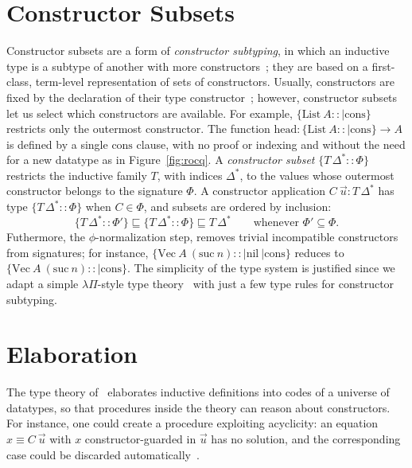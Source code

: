 \documentclass[12pt]{article}
\begin{document}
\section{Constructor Subsets}
Constructor subsets are a form of \emph{constructor subtyping}, in which an inductive type is a subtype of another with more constructors~\cite{BatheGillesFradeMaria,MarmadukeJenkinsStump}; they are based on a first-class, term-level representation of sets of constructors.
Usually, constructors are fixed by the declaration of their type constructor~\cite{coquand,paulin1993inductive}; however, constructor subsets let us select which constructors are available.
For example, $\{\text{List}\:A :: |\text{cons}\}$ restricts only the outermost constructor.
The function $\text{head} : \{\text{List}\:A :: |\text{cons}\} \to A$ is defined by a single $\text{cons}$ clause, with no proof or indexing and without the need for a new datatype as in Figure~\ref{fig:rocq}.
A \emph{constructor subset} $\{T\,\Delta^{*} :: \Phi\}$ restricts the inductive family $T$, with indices $\Delta^{*}$, to the values whose outermost constructor belongs to the signature $\Phi$.
A constructor application $C\:\overrightarrow{u} : T\,\Delta^{*}$ has type $\{T\,\Delta^{*} :: \Phi\}$ when $C \in \Phi$, and subsets are ordered by inclusion:
\[
\{T\,\Delta^{*} :: \Phi'\} \sqsubseteq \{T\,\Delta^{*} :: \Phi\} \sqsubseteq T\,\Delta^{*}
\qquad \text{whenever } \Phi' \subseteq \Phi.
\]
Futhermore, the $\phi$-normalization step, removes trivial incompatible constructors from signatures; for instance, $\{\text{Vec}\:A\:(\text{suc}\:n) :: |\text{nil}\:|\text{cons}\}$ reduces to $\{\text{Vec}\:A\:(\text{suc}\:n) :: |\text{cons}\}$.
The simplicity of the type system is justified since we adapt a simple $\lambda\Pi$-style type theory~\cite{harper1993framework} with just a few type rules for constructor subtyping.

\section{Elaboration}\label{sec:elaboration}
The type theory of~\cite{dagand2012elaborating} elaborates inductive definitions into codes of a universe of datatypes, so that procedures inside the theory can reason about constructors.
For instance, one could create a procedure exploiting acyclicity: an equation $x \equiv C\:\overrightarrow{u}$ with $x$ constructor-guarded in $\overrightarrow{u}$ has no solution, and the corresponding case could be discarded automatically~\cite{mcbride2006constructions}.
\end{document}
